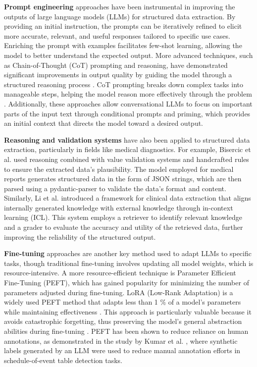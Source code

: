 \documentclass{article}
\begin{document}
\textbf{Prompt engineering} approaches have been instrumental in improving the outputs of large language models (LLMs) for structured data extraction. By providing an initial instruction, the prompts can be iteratively refined to elicit more accurate, relevant, and useful responses tailored to specific use cases. Enriching the prompt with examples facilitates few-shot learning, allowing the model to better understand the expected output. More advanced techniques, such as Chain-of-Thought (CoT) prompting and reasoning, have demonstrated significant improvements in output quality by guiding the model through a structured reasoning process \cite{10.1145/3639631.3639663}. CoT prompting breaks down complex tasks into manageable steps, helping the model reason more effectively through the problem \cite{wei2023chainofthoughtpromptingelicitsreasoning}. Additionally, these approaches allow conversational LLMs to focus on important parts of the input text through conditional prompts and priming, which provides an initial context that directs the model toward a desired output.

\textbf{Reasoning and validation systems} have also been applied to structured data extraction, particularly in fields like medical diagnostics. For example, Bisercic et al. \cite{bisercic2023interpretable} used reasoning combined with value validation systems and handcrafted rules to ensure the extracted data's plausibility. The model employed for medical reports generates structured data in the form of JSON strings, which are then parsed using a pydantic-parser to validate the data’s format and content. Similarly, Li et al. \cite{li2024automatedclinicaldataextraction} introduced a framework for clinical data extraction that aligns internally generated knowledge with external knowledge through in-context learning (ICL). This system employs a retriever to identify relevant knowledge and a grader to evaluate the accuracy and utility of the retrieved data, further improving the reliability of the structured output.

\textbf{Fine-tuning} approaches are another key method used to adapt LLMs to specific tasks, though traditional fine-tuning involves updating all model weights, which is resource-intensive. A more resource-efficient technique is Parameter Efficient Fine-Tuning (PEFT), which has gained popularity for minimizing the number of parameters adjusted during fine-tuning. LoRA (Low-Rank Adaptation) is a widely used PEFT method that adapts less than 1 \% of a model’s parameters while maintaining effectiveness \cite{hu2021loralowrankadaptationlarge}. This approach is particularly valuable because it avoids catastrophic forgetting, thus preserving the model's general abstraction abilities during fine-tuning \cite{zhai2023investigatingcatastrophicforgettingmultimodal}. PEFT has been shown to reduce reliance on human annotations, as demonstrated in the study by Kumar et al. \cite{kumar2024selectivefinetuningllmlabeleddata}, where synthetic labels generated by an LLM were used to reduce manual annotation efforts in schedule-of-event table detection tasks.
\end{document}
